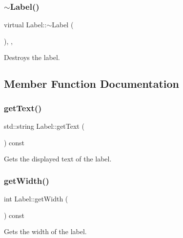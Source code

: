 \subsubsection{\texorpdfstring{$\sim$Label()}{~Label()}}
{\footnotesize\ttfamily virtual Label\+::$\sim$\+Label (\begin{DoxyParamCaption}{ }\end{DoxyParamCaption})\hspace{0.3cm}{\ttfamily [inline]}, {\ttfamily [override]}, {\ttfamily [virtual]}}



Destroys the label. 



\subsection{Member Function Documentation}
\mbox{\label{class_label_a5306a233501af781095f08e95ebcfb23}} 
\subsubsection{\texorpdfstring{getText()}{getText()}}
{\footnotesize\ttfamily std\+::string Label\+::get\+Text (\begin{DoxyParamCaption}{ }\end{DoxyParamCaption}) const}



Gets the displayed text of the label. 

\mbox{\label{class_label_a81c445ff99fbdfa3ca662783568adda8}} 
\subsubsection{\texorpdfstring{getWidth()}{getWidth()}}
{\footnotesize\ttfamily int Label\+::get\+Width (\begin{DoxyParamCaption}{ }\end{DoxyParamCaption}) const}



Gets the width of the label. 

\mbox{\label{class_label_ac418a8328a971f5da7f46c9c6e9fd7e5}} 
